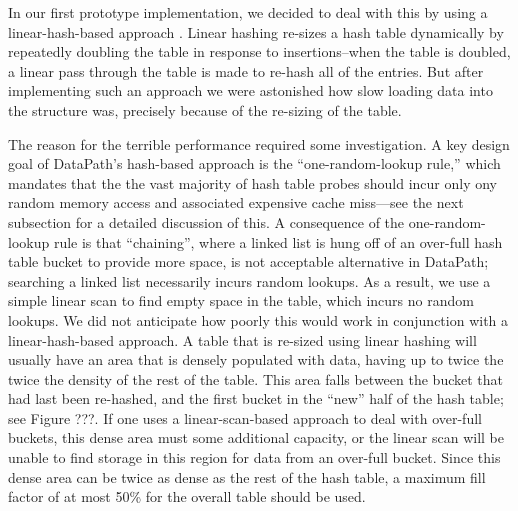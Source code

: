 \documentclass{sig-alternate}
\renewcommand\:{\colon} %
\begin{document}
In our first prototype implementation, we decided to deal with this by using a linear-hash-based approach \cite{}.  Linear hashing re-sizes
a hash table dynamically by repeatedly doubling the table in response to insertions--when the table is doubled, a linear pass
through the table is made to re-hash all of the entries.
But after implementing such an approach we were astonished 
how slow loading data into the structure was, precisely
because of the re-sizing of the table.

The reason for the terrible performance required some investigation.
A key design goal of DataPath's hash-based approach is the ``one-random-lookup rule,'' which mandates that the 
the vast majority of hash table probes should incur only ony random memory access and associated expensive cache miss---see the next subsection for
a detailed discussion of this. A consequence of the one-random-lookup rule is that
``chaining'', where a linked list is hung off of an over-full hash table bucket to provide more space,
is not acceptable alternative in DataPath;
searching
a linked list necessarily incurs random lookups.  As a result, we use a simple linear scan to find empty space in the table, which
incurs no random lookups.
We did not anticipate how poorly this would work in conjunction with a linear-hash-based approach.
A table that is re-sized using linear hashing will usually have an area that is densely populated with data, having up to twice
the 
twice the density of the rest of the table.  This area
falls between the bucket that had last been re-hashed, and the first bucket in the ``new'' half of the hash table;
see Figure ???.  If one uses a linear-scan-based approach to deal with over-full buckets,
this dense area must some additional capacity, or the linear scan will be unable to find storage in this region
for data from an 
over-full bucket.  Since this dense area can be twice as dense as the rest of the hash table,
a maximum fill factor of at most 50\% for the overall table should be used.  
\end{document}

